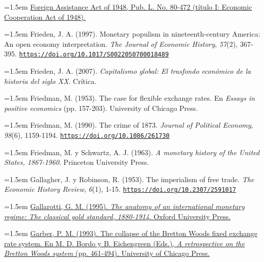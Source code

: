 \documentclass[10pt,a4paper]{article}
\begin{document}
{\sloppy\noindent\hangindent=1.5em \href{https://fraser.stlouisfed.org/files/docs/historical/congressional/foreign-assistance-act-1948.pdf}{Foreign Assistance Act of 1948, Pub. L. No. 80-472 (título I: Economic Cooperation Act of 1948).}\par}

{\sloppy\noindent\hangindent=1.5em Frieden, J. A. (1997). Monetary populism in nineteenth-century America: An open economy interpretation. \textit{The Journal of Economic History}, \textit{57}(2), 367-395. \href{https://doi.org/10.1017/S0022050700018489}{\nolinkurl{https://doi.org/10.1017/S0022050700018489}}\par}

\noindent\hangindent=1.5em Frieden, J. A. (2007). \textit{Capitalismo global: El trasfondo económico de la historia del siglo XX}. Crítica.

\noindent\hangindent=1.5em Friedman, M. (1953). The case for flexible exchange rates. En \textit{Essays in positive economics} (pp. 157-203). University of Chicago Press.

{\sloppy\noindent\hangindent=1.5em Friedman, M. (1990). The crime of 1873. \textit{Journal of Political Economy}, \textit{98}(6), 1159-1194. \href{https://doi.org/10.1086/261730}{\nolinkurl{https://doi.org/10.1086/261730}}\par}

{\sloppy\noindent\hangindent=1.5em Friedman, M. y Schwartz, A. J. (1963). \textit{A monetary history of the United States, 1867-1960}. Princeton University Press.\par}

{\sloppy\noindent\hangindent=1.5em Gallagher, J. y Robinson, R. (1953). The imperialism of free trade. \textit{The Economic History Review}, \textit{6}(1), 1-15. \href{https://doi.org/10.2307/2591017}{\nolinkurl{https://doi.org/10.2307/2591017}}\par}

{\sloppy\noindent\hangindent=1.5em \href{https://econpapers.repec.org/RePEc:oxp:obooks:9780195089905}{Gallarotti, G. M. (1995). \textit{The anatomy of an international monetary regime: The classical gold standard, 1880-1914}. Oxford University Press.}\par}

{\sloppy\noindent\hangindent=1.5em \href{https://www.nber.org/chapters/c6876.pdf}{Garber, P. M. (1993). The collapse of the Bretton Woods fixed exchange rate system. En M. D. Bordo y B. Eichengreen (Eds.), \textit{A retrospective on the Bretton Woods system} (pp. 461-494). University of Chicago Press.}\par}
\end{document}
